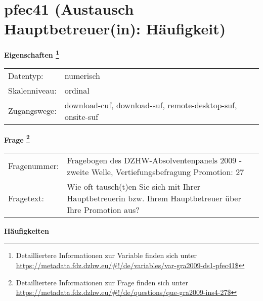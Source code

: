 
    \setcounter{footnote}{0}

    \vspace*{-1.8cm}
	\section{pfec41 (Austausch Hauptbetreuer(in): Häufigkeit)}
	\label{section:pfec41}



    \vspace*{0.5cm}
    \noindent\textbf{Eigenschaften
	\footnote{Detailliertere Informationen zur Variable finden sich unter
		\url{https://metadata.fdz.dzhw.eu/\#!/de/variables/var-gra2009-ds1-pfec41$}}}\\
	\begin{tabularx}{\hsize}{@{}lX}
	Datentyp: & numerisch \\
	Skalenniveau: & ordinal \\
	Zugangswege: &
	  download-cuf, 
	  download-suf, 
	  remote-desktop-suf, 
	  onsite-suf
 \\
    \end{tabularx}



				\vspace*{0.5cm}
                \noindent\textbf{Frage
	                \footnote{Detailliertere Informationen zur Frage finden sich unter
		              \url{https://metadata.fdz.dzhw.eu/\#!/de/questions/que-gra2009-ins4-27$}}}\\
				\begin{tabularx}{\hsize}{@{}lX}
					Fragenummer: &
					  Fragebogen des DZHW-Absolventenpanels 2009 - zweite Welle, Vertiefungsbefragung Promotion:
					  27
 \\
					Fragetext: & Wie oft tausch(t)en Sie sich mit Ihrer Hauptbetreuerin bzw. Ihrem Hauptbetreuer über Ihre Promotion aus? \\
				\end{tabularx}





        		\vspace*{0.5cm}
                \noindent\textbf{Häufigkeiten}

